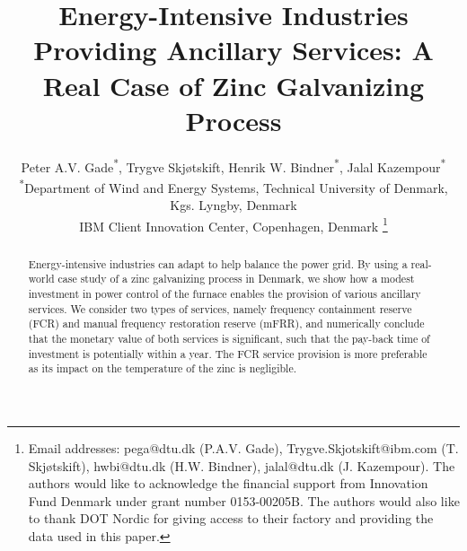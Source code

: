 \documentclass[conference]{IEEEtran}
\begin{document}
\title{Energy-Intensive Industries Providing Ancillary Services: A  Real Case of Zinc Galvanizing Process}

\author{Peter A.V. Gade\textsuperscript{*}\textsuperscript{\textdagger}, Trygve Skjøtskift\textsuperscript{\textdagger}, Henrik W. Bindner\textsuperscript{*}, Jalal Kazempour\textsuperscript{*} \\
    \textsuperscript{*}Department of Wind and Energy Systems, Technical University of Denmark, Kgs. Lyngby, Denmark \\
    \textsuperscript{\textdagger}IBM Client Innovation Center, Copenhagen, Denmark
    \thanks{
        Email addresses: pega@dtu.dk (P.A.V. Gade), Trygve.Skjotskift@ibm.com (T. Skjøtskift), hwbi@dtu.dk (H.W. Bindner), jalal@dtu.dk (J. Kazempour). The authors would like to acknowledge the financial support from Innovation Fund Denmark under grant number 0153-00205B. The authors would also like to thank DOT Nordic for giving access to their factory and providing the data used in this paper.}%

    \vspace{-3mm}
}

\maketitle

\IEEEaftertitletext{\vspace{-0.8\baselineskip}}
\maketitle
\thispagestyle{plain}
\pagestyle{plain}

\begin{abstract}
    Energy-intensive industries can adapt to help balance the power grid. %
    By using a real-world case study of a zinc galvanizing process in Denmark, we show how a modest investment in power control of the furnace enables the provision of various ancillary services. We consider two types of services, namely frequency containment reserve (FCR) and manual frequency restoration reserve (mFRR), and numerically conclude that the monetary value of both services is significant, such that the pay-back time of investment is potentially within a year. The FCR service provision is more preferable as its impact on the temperature of the zinc is negligible.
\end{abstract}
\end{document}
